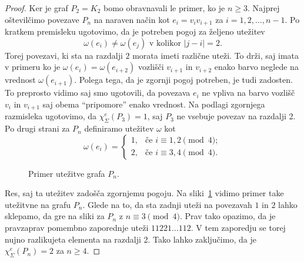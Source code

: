 \documentclass[12pt,a4paper,twoside]{article}
\theoremstyle{definition} %
\theoremstyle{plain} %
\newcommand{\ec}{\chi_{\Sigma}^e}
\numberwithin{equation}{section}  %
\begin{document}
\begin{proof}
	Ker je graf $P_2 = K_2$ bomo obravnavali le primer, ko je $n \ge 3$. Najprej oštevilčimo povezave $P_n$ na naraven način kot $e_i = v_i v_{i+1}$ za $i=1,2,\ldots, n-1$. Po kratkem premisleku ugotovimo, da je potreben pogoj za željeno utežitev
	$$\omega(e_i) \neq \omega(e_j) \text{ v kolikor } |j-i| = 2 .$$
	Torej povezavi, ki sta na razdalji $2$ morata imeti različne uteži. To drži, saj imata v primeru ko je $\omega(e_i) = \omega(e_{i+2})$ vozlišči $v_{i+1}$ in $v_{i+2}$ enako barvo neglede na vrednost $\omega(e_{i+1})$. Polega tega, da je zgornji pogoj potreben, je tudi zadosten. To preprosto vidimo saj smo ugotovili, da povezava $e_{i}$ ne vpliva na barvo vozlišč $v_i$ in $v_{i+1}$ saj obema ``pripomore'' enako vrednost. Na podlagi zgornjega razmisleka ugotovimo, da $\ec(P_3) = 1$, saj $P_3$ ne vsebuje povezav na razdalji 2. Po drugi strani za $P_n$ definiramo utežitev $\omega$ kot
	\begin{equation*}
	\omega(e_i) = \begin{cases}
			1, &\text{če } i \equiv 1,2 \pmod{4} ;\\ 
			2, &\text{če } i \equiv 3,4 \pmod{4} .
	\end{cases}
	\end{equation*}
	
	\begin{figure}[!h]
		\centering
		
		\caption{Primer utežitve grafa $P_n$.}
	\label{pn}
	\end{figure}
	Res, saj ta utežitev zadošča zgornjemu pogoju. Na sliki~\ref{pn} vidimo primer take utežitvne na grafu $P_n$. Glede na to, da sta zadnji uteži na povezavah $1$ in $2$ lahko sklepamo, da gre na sliki za $P_n$ z $n \equiv 3 \pmod{4}$. Prav tako opazimo, da je pravzaprav pomembno zaporednje uteži $11221\ldots 112$. V tem zaporedju se torej nujno razlikujeta elementa na razdalji 2. Tako lahko zaključimo, da je $\ec(P_n) = 2$ za $n \ge 4$. 


\end{proof}
\end{document}

